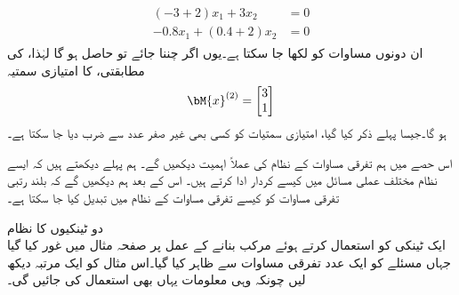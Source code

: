 \begin{gather*}
\begin{aligned}
(-3+2)x_1+3x_2&=0\\
-0.8x_1+(0.4+2)x_2&=0
\end{aligned}
\end{gather*}
ان دونوں مساوات کو  لکھا جا سکتا ہے۔یوں اگر  چننا جائے تو  حاصل ہو گا لہٰذا،  کی مطابقتی،  کا امتیازی سمتیہ 
\begin{align*}
\bM{x}^{(2)}=
\begin{bmatrix*}[r]
3\\
1
\end{bmatrix*}
\end{align*}
ہو گا۔جیسا پہلے ذکر کیا گیا، امتیازی سمتیات کو کسی  بھی غیر صفر عدد سے ضرب دیا جا سکتا ہے۔

اس حصے میں ہم  تفرقی مساوات کے نظام کی عملاً اہمیت دیکھیں گے۔ ہم پہلے دیکھتے ہیں کہ ایسے نظام مختلف عملی مسائل میں کیسے کردار ادا کرتے ہیں۔ اس کے بعد ہم دیکھیں گے کہ بلند رتبی تفرقی مساوات کو کیسے تفرقی مساوات کے نظام میں تبدیل کیا جا سکتا ہے۔

\quad دو ٹینکیوں کا نظام\\
ایک ٹینکی کو استعمال کرتے ہوئے مرکب بنانے کے عمل پر صفحہ  مثال  میں غور کیا گیا جہاں مسئلے کو ایک عدد تفرقی مساوات سے ظاہر کیا گیا۔اس مثال کو ایک مرتبہ دیکھ لیں چونکہ وہی معلومات یہاں بھی استعمال کی جائیں گی۔
 
